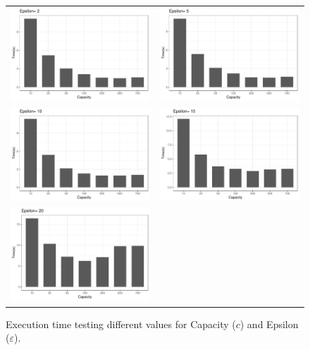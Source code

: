 \begin{figure}
    \centering
    \begin{tabular}{c c}
         \includegraphics[width=0.45\linewidth]{chapter4/figures/plots/01_optimal_performance/pflockE2_by_capacity.pdf} & 
         \includegraphics[width=0.45\linewidth]{chapter4/figures/plots/01_optimal_performance/pflockE5_by_capacity.pdf} \\
         \includegraphics[width=0.45\linewidth]{chapter4/figures/plots/01_optimal_performance/pflockE10_by_capacity.pdf} &
         \includegraphics[width=0.45\linewidth]{chapter4/figures/plots/01_optimal_performance/pflockE15_by_capacity.pdf} \\ 
         \includegraphics[width=0.45\linewidth]{chapter4/figures/plots/01_optimal_performance/pflockE20_by_capacity.pdf} & \\
    \end{tabular}
    \caption{Execution time testing different values for Capacity ($c$) and Epsilon  ($\varepsilon$).}\label{fig:optimal_performance}
\end{figure}

